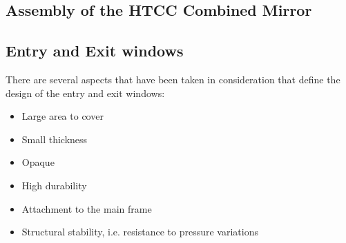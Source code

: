 \subsection{Assembly of the HTCC Combined Mirror}


\subsection{Entry and Exit windows}

\indent There are several aspects that have been taken in consideration that define the design of the entry and exit windows:

\begin{itemize}
    \item Large area to cover
    \item Small thickness
    \item Opaque
    \item High durability
    \item Attachment to the main frame
    \item Structural stability, i.e. resistance to pressure variations
    \end{itemize}


